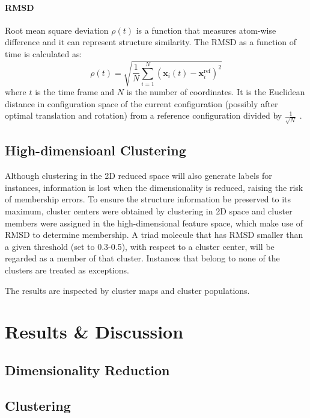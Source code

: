\documentclass[a4paper]{article}
\begin{document}
\paragraph{RMSD}
Root mean square deviation \( \rho(t) \) is a function that measures atom-wise difference and it can represent structure similarity. The RMSD as a function of time is calculated as:
\begin{equation}
    \rho(t)=\sqrt{\frac{1}{N}\sum_{i=1}^N\left(\bm{x}_i(t)-\bm{x}_i^\text{ref}\right)^2}
\end{equation}
\noindent where \(t\) is the time frame and \(N\) is the number of coordinates. It is the Euclidean distance in configuration space of the current configuration (possibly after optimal translation and rotation) from a reference configuration divided by \(\frac{1}{\sqrt{N}}\) \cite{scikit-learn}.

\subsection{High-dimensioanl Clustering}
Although clustering in the 2D reduced space will also generate labels for instances, information is lost when the dimensionality is reduced, raising the risk of membership errors. To ensure the structure information be preserved to its maximum, cluster centers were obtained by clustering in 2D space and cluster members were assigned in the high-dimensional feature space, which make use of RMSD to determine membership. A triad molecule that has RMSD smaller than a given threshold (set to 0.3-0.5), with respect to a cluster center, will be regarded as a member of that cluster. Instances that belong to none of the clusters are treated as exceptions. 

The results are inspected by cluster maps and cluster populations. 

\section{Results \& Discussion}

\subsection{Dimensionality Reduction}

\subsection{Clustering}
\end{document}

